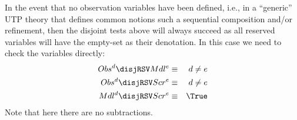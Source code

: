 In the event that no observation variables have been defined,
i.e., in a ``generic'' UTP theory that defines common notions such
a sequential composition and/or refinement,
then the disjoint tests above will always succeed as all reserved variables
will have the empty-set as their denotation.
In this case we need to check the variables directly:
\begin{eqnarray*}
   Obs^d \disjRSV Mdl^e &\equiv& d \neq e
\\ Obs^d \disjRSV Scr^e &\equiv& d \neq e
\\ Mdl^d \disjRSV Scr^e &\equiv& \True
\end{eqnarray*}
Note that here there are no subtractions.
